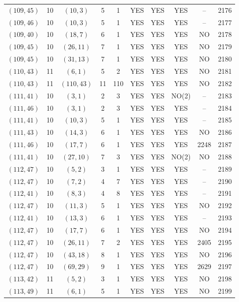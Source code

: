 \begin{longtable}{|c|c|c|c|c|c|c|c|c|c|}
$(109, 45)$ & 10 & $(10, 3)$ & 5 & 1 & YES & YES & YES & -- & 2176\\
$(109, 46)$ & 10 & $(10, 3)$ & 5 & 1 & YES & YES & YES & -- & 2177\\
$(109, 40)$ & 10 & $(18, 7)$ & 6 & 1 & YES & YES & YES & NO & 2178\\
$(109, 45)$ & 10 & $(26, 11)$ & 7 & 1 & YES & YES & YES & NO & 2179\\
$(109, 45)$ & 10 & $(31, 13)$ & 7 & 1 & YES & YES & YES & NO & 2180\\
$(110, 43)$ & 11 & $(6, 1)$ & 5 & 2 & YES & YES & YES & NO & 2181\\
$(110, 43)$ & 11 & $(110, 43)$ & 11 & 110 & YES & YES & YES & NO & 2182\\
$(111, 41)$ & 10 & $(3, 1)$ & 2 & 3 & YES & YES & NO(2) & -- & 2183\\
$(111, 46)$ & 10 & $(3, 1)$ & 2 & 3 & YES & YES & YES & -- & 2184\\
$(111, 41)$ & 10 & $(10, 3)$ & 5 & 1 & YES & YES & YES & -- & 2185\\
$(111, 43)$ & 10 & $(14, 3)$ & 6 & 1 & YES & YES & YES & NO & 2186\\
$(111, 46)$ & 10 & $(17, 7)$ & 6 & 1 & YES & YES & YES & 2248 & 2187\\
$(111, 41)$ & 10 & $(27, 10)$ & 7 & 3 & YES & YES & NO(2) & NO & 2188\\
$(112, 47)$ & 10 & $(5, 2)$ & 3 & 1 & YES & YES & YES & -- & 2189\\
$(112, 47)$ & 10 & $(7, 2)$ & 4 & 7 & YES & YES & YES & -- & 2190\\
$(112, 41)$ & 10 & $(8, 3)$ & 4 & 8 & YES & YES & YES & -- & 2191\\
$(112, 47)$ & 10 & $(11, 3)$ & 5 & 1 & YES & YES & YES & NO & 2192\\
$(112, 41)$ & 10 & $(13, 3)$ & 6 & 1 & YES & YES & YES & -- & 2193\\
$(112, 47)$ & 10 & $(17, 7)$ & 6 & 1 & YES & YES & YES & NO & 2194\\
$(112, 47)$ & 10 & $(26, 11)$ & 7 & 2 & YES & YES & YES & 2405 & 2195\\
$(112, 47)$ & 10 & $(43, 18)$ & 8 & 1 & YES & YES & YES & NO & 2196\\
$(112, 47)$ & 10 & $(69, 29)$ & 9 & 1 & YES & YES & YES & 2629 & 2197\\
$(113, 42)$ & 11 & $(5, 2)$ & 3 & 1 & YES & YES & YES & NO & 2198\\
$(113, 49)$ & 11 & $(6, 1)$ & 5 & 1 & YES & YES & YES & NO & 2199\\

\end{longtable}
